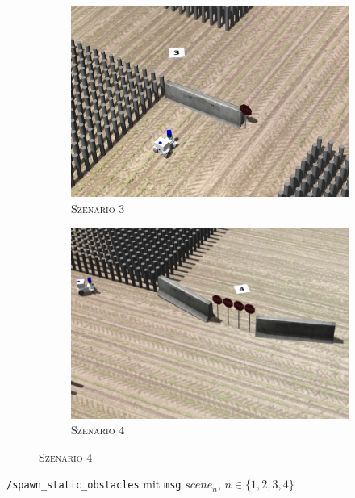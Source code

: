 \documentclass{beamer}
\newcommand{\code}[1]{\colorbox{light-gray}{\texttt{#1}}}
\begin{document}
\begin{frame}
\begin{figure}[H]
\begin{subfigure}[b]{0.24\textwidth}
        \centering
        \includegraphics[width=\textwidth]{img/static_3.png}
        \caption{\textsc{Szenario $3$}}
        \label{fig:static_3}
    \end{subfigure}
    \hfill
    \begin{subfigure}[b]{0.24\textwidth}
        \centering
        \includegraphics[width=\textwidth]{img/static_4.png}
        \caption{\textsc{Szenario $4$}}
        \label{fig:static_4}
    \end{subfigure}
  \end{figure}
  \newcommand{\squeezeup}{\vspace{-4.5mm}}
  \squeezeup
  \code{/spawn\_static\_obstacles} mit \code{msg} $scene_n$, $n \in \{1, 2, 3, 4\}$
  \begin{figure}[H]
    \centering
    \begin{subfigure}[b]{0.24\textwidth}

\end{subfigure}
\end{figure}
\end{frame}
\end{document}
